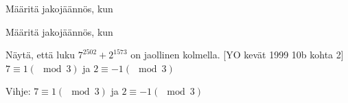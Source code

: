 \begin{tehtavasivu}
\Harjoitustehtavat

\setcounter{tehtava}{0}

\begin{tehtava}

Määritä jakojäännös, kun
\begin{alakohdat}
\end{alakohdat}
  \begin{vastaus}
    \begin{alakohdat}
     \end{alakohdat}
  \end{vastaus}
\end{tehtava}


\begin{tehtava}
 Määritä jakojäännös, kun
\begin{alakohdat}
\end{alakohdat}
\begin{vastaus}
    \begin{alakohdat}
	\end{alakohdat}
\end{vastaus}
	\end{tehtava}

\begin{tehtava}
Näytä, että luku $7^{2502} + 2^{1573}$ on jaollinen kolmella. [YO kevät 1999 10b kohta 2]
$7 \equiv 1 (\mod{3})$ ja $2 \equiv -1 (\mod{3})$
\begin{vastaus}
Vihje: $7 \equiv 1 (\mod{3})$ ja $2 \equiv -1 (\mod{3})$
\end{vastaus}

\end{tehtava}




\end{tehtavasivu}
